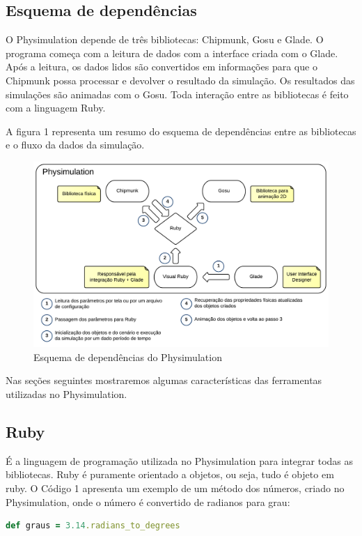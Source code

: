 \subsection{Esquema de dependências}
O Physimulation depende de três bibliotecas: Chipmunk, Gosu e Glade. O programa começa com a leitura de dados com a interface criada com o Glade. Após a leitura, 
os dados lidos são convertidos em informações para que o Chipmunk possa processar e devolver o resultado da simulação. Os resultados das simulações são animadas 
com o Gosu. Toda interação entre as bibliotecas é feito com a linguagem Ruby.

A figura 1 representa um resumo do esquema de dependências entre as bibliotecas e o fluxo da dados da simulação.

\begin{figure}[!htbp]
  \includegraphics[scale=0.2]{EsquemaDependencia.png}
  \caption{Esquema de dependências do Physimulation}
\end{figure}

Nas seções seguintes mostraremos algumas características das ferramentas utilizadas no Physimulation.

\subsection{Ruby}
É a linguagem de programação utilizada no Physimulation para integrar todas as bibliotecas.
Ruby é puramente orientado a objetos, ou seja, tudo é objeto em ruby. O Código 1 apresenta um exemplo de um método dos números, criado no Physimulation, onde o 
número é convertido de radianos para grau:

\begin{lstlisting}[language=Ruby, caption=Conversão de radianos em graus]
  def graus = 3.14.radians_to_degrees
\end{lstlisting}


